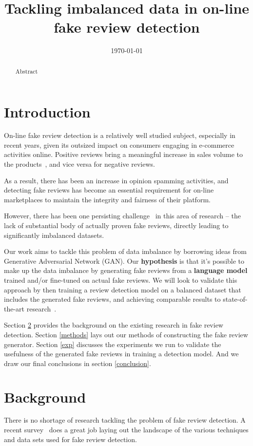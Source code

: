 \documentclass[conference]{IEEEtran} %
\title{Tackling imbalanced data in on-line fake review detection}
\date{\today}
\author{\IEEEauthorblockN{Satheesh Joseph}
\and
\IEEEauthorblockN{Catherine Mou}
\and
\IEEEauthorblockN{Yi Zhang}
}
\theoremstyle{plain}
\theoremstyle{definition}
\begin{document}
\maketitle



\begin{abstract}
Abstract
\end{abstract}

\section{Introduction}
\label{intro}
On-line fake review detection is a relatively well studied subject, especially in recent years, given its outsized impact on consumers engaging in e-commerce activities online. Positive reviews bring a meaningful increase in sales volume to the products~\cite{ho2013effects}, and vice versa for negative reviews.

As a result, there has been an increase in opinion spamming activities, and detecting fake reviews has become an essential requirement for on-line marketplaces to maintain the integrity and fairness of their platform.

However, there has been one persisting challenge~\cite{stanton2019gans, Tang2020, wang2020fake, yuan2019learning} in this area of research -- the lack of substantial body of actually proven fake reviews, directly leading to significantly imbalanced datasets.

Our work aims to tackle this problem of data imbalance by borrowing ideas from Generative Adversarial Network (GAN). Our \textbf{hypothesis} is that it's possible to make up the data imbalance by generating fake reviews from a \textbf{language model} trained and/or fine-tuned on actual fake reviews. We will look to validate this approach by then training a review detection model on a balanced dataset that includes the generated fake reviews, and achieving comparable results to state-of-the-art research~\cite{Tang2020}.

Section \ref{bg} provides the background on the existing research in fake review detection. Section \ref{methods} lays out our methods of constructing the fake review generator. Section \ref{exp} discusses the experiments we run to validate the usefulness of the generated fake reviews in training a detection model. And we draw our final conclusions in section \ref{conclusion}.


\section{Background}
\label{bg}
There is no shortage of research tackling the problem of fake review detection. A recent survey~\cite{Mohawesh2021} does a great job laying out the landscape of the various techniques and data sets used for fake review detection.
\end{document}
